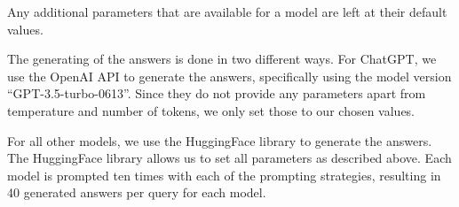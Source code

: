 Any additional parameters that are available for a model are left at their default values.

The generating of the answers is done in two different ways.
For ChatGPT, we use the OpenAI API to generate the answers, specifically using the model version ``GPT-3.5-turbo-0613''.
Since they do not provide any parameters apart from temperature and number of tokens, we only set those to our chosen values.

For all other models, we use the HuggingFace library to generate the answers.
The HuggingFace library allows us to set all parameters as described above.
Each model is prompted ten times with each of the prompting strategies, resulting in 40 generated answers per query for each model.
